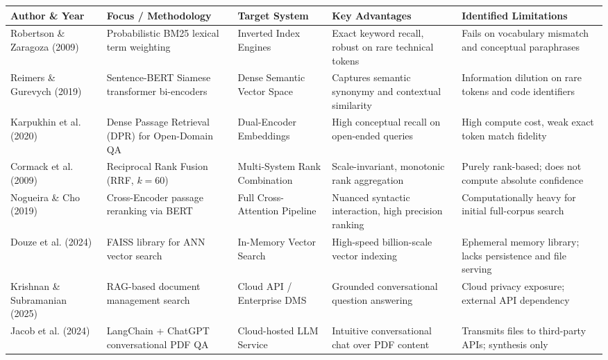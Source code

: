 \documentclass[a4paper,12pt]{article}
\begin{document}
\begin{table}[H]
\centering
\fontsize{7.5pt}{9.5pt}\selectfont
\renewcommand{\arraystretch}{1.2}
\setlength{\tabcolsep}{3pt}
\begin{tabularx}{\textwidth}{|p{2.6cm}|p{2.8cm}|p{2.2cm}|p{3.2cm}|X|}
\hline
\rowcolor{gray!15} \textbf{Author \& Year} & \textbf{Focus / Methodology} & \textbf{Target System} & \textbf{Key Advantages} & \textbf{Identified Limitations} \\ \hline
Robertson \& Zaragoza (2009)~\cite{robertson2009probabilistic} & Probabilistic BM25 lexical term weighting & Inverted Index Engines & Exact keyword recall, robust on rare technical tokens & Fails on vocabulary mismatch and conceptual paraphrases \\ \hline
Reimers \& Gurevych (2019)~\cite{reimers2019sentence} & Sentence-BERT Siamese transformer bi-encoders & Dense Semantic Vector Space & Captures semantic synonymy and contextual similarity & Information dilution on rare tokens and code identifiers \\ \hline
Karpukhin et al. (2020)~\cite{karpukhin2020dense} & Dense Passage Retrieval (DPR) for Open-Domain QA & Dual-Encoder Embeddings & High conceptual recall on open-ended queries & High compute cost, weak exact token match fidelity \\ \hline
Cormack et al. (2009)~\cite{cormack2009reciprocal} & Reciprocal Rank Fusion (RRF, $k=60$) & Multi-System Rank Combination & Scale-invariant, monotonic rank aggregation & Purely rank-based; does not compute absolute confidence \\ \hline
Nogueira \& Cho (2019)~\cite{nogueira2019passage} & Cross-Encoder passage reranking via BERT & Full Cross-Attention Pipeline & Nuanced syntactic interaction, high precision ranking & Computationally heavy for initial full-corpus search \\ \hline
Douze et al. (2024)~\cite{douze2024faiss} & FAISS library for ANN vector search & In-Memory Vector Search & High-speed billion-scale vector indexing & Ephemeral memory library; lacks persistence and file serving \\ \hline
Krishnan \& Subramanian (2025)~\cite{krishnan2025semantic} & RAG-based document management search & Cloud API / Enterprise DMS & Grounded conversational question answering & Cloud privacy exposure; external API dependency \\ \hline
Jacob et al. (2024)~\cite{jacob2024chatgpt} & LangChain + ChatGPT conversational PDF QA & Cloud-hosted LLM Service & Intuitive conversational chat over PDF content & Transmits files to third-party APIs; synthesis only \\ \hline

\end{tabularx}
\end{table}
\end{document}
